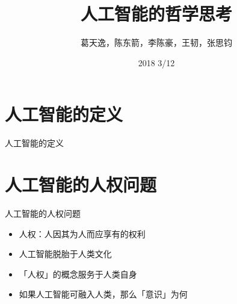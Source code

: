 \documentclass{beamer}
\title{人工智能的哲学思考}
\date{2018 3/12}
\author{葛天逸，陈东箭，李陈豪，王韧，张思钧}
\institute{马克思主义基本原理概论课堂讨论}
\begin{document}
  \maketitle
  \tableofcontents
  \section{人工智能的定义}
  \begin{frame}{人工智能的定义}
  \end{frame}
  \section{人工智能的人权问题}
  \begin{frame}{人工智能的人权问题}
    \begin{itemize}
     \item 人权：人因其为人而应享有的权利
     \item 人工智能脱胎于人类文化
     \item 「人权」的概念服务于人类自身  
     \item 如果人工智能可融入人类，那么「意识」为何
    \end{itemize}
  \end{frame}
  
\end{document}
